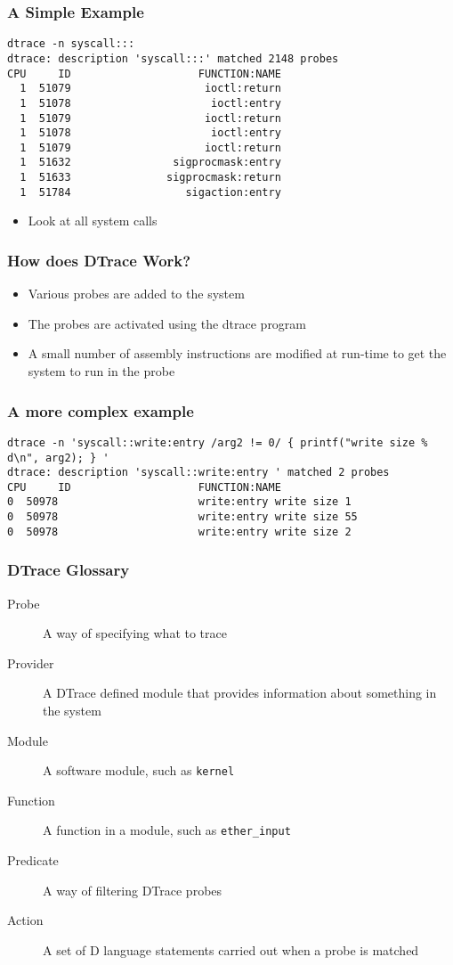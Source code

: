 \documentclass[pdftex]{beamer} %
\begin{document}
\begin{frame}[fragile]
  \frametitle{A Simple Example}
  \begin{lstlisting}
dtrace -n syscall:::
dtrace: description 'syscall:::' matched 2148 probes
CPU     ID                    FUNCTION:NAME
  1  51079                     ioctl:return 
  1  51078                      ioctl:entry 
  1  51079                     ioctl:return 
  1  51078                      ioctl:entry 
  1  51079                     ioctl:return 
  1  51632                sigprocmask:entry 
  1  51633               sigprocmask:return 
  1  51784                  sigaction:entry 
  \end{lstlisting}
  \begin{itemize}
  \item Look at all system calls
  \end{itemize}
\end{frame}

\begin{frame}
  \frametitle{How does DTrace Work?}
  \begin{itemize}
  \item Various probes are added to the system
  \item The probes are activated using the dtrace program
  \item A small number of assembly instructions are modified at
    run-time to get the system to run in the probe
  \end{itemize}
\end{frame}

\begin{frame}[fragile]
  \frametitle{A more complex example}
\begin{lstlisting}
dtrace -n 'syscall::write:entry /arg2 != 0/ { printf("write size % d\n", arg2); } '
dtrace: description 'syscall::write:entry ' matched 2 probes
CPU     ID                    FUNCTION:NAME
0  50978                      write:entry write size 1
0  50978                      write:entry write size 55
0  50978                      write:entry write size 2
\end{lstlisting}
\end{frame}

\begin{frame}[fragile]
  \frametitle{DTrace Glossary}
  \begin{description}
  \item[Probe] A way of specifying what to trace
  \item[Provider] A DTrace defined module that provides information
    about something in the system
  \item[Module] A software module, such as \Verb+kernel+
  \item[Function] A function in a module, such as \Verb+ether_input+
  \item[Predicate] A way of filtering DTrace probes
  \item[Action] A set of D language statements carried out when a probe
    is matched
  \end{description}
\end{frame}
\end{document}
